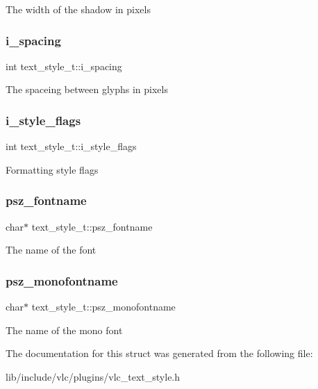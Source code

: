 The width of the shadow in pixels \mbox{\label{structtext__style__t_a2280d36ffa825efb34586276be989ca0}} 
\subsubsection{\texorpdfstring{i\+\_\+spacing}{i\_spacing}}
{\footnotesize\ttfamily int text\+\_\+style\+\_\+t\+::i\+\_\+spacing}

The spaceing between glyphs in pixels \mbox{\label{structtext__style__t_a5eed3da14743434cdd9f3ad856b0057a}} 
\subsubsection{\texorpdfstring{i\+\_\+style\+\_\+flags}{i\_style\_flags}}
{\footnotesize\ttfamily int text\+\_\+style\+\_\+t\+::i\+\_\+style\+\_\+flags}

Formatting style flags \mbox{\label{structtext__style__t_a638ddc05711093db5ce4b05870c19b1e}} 
\subsubsection{\texorpdfstring{psz\+\_\+fontname}{psz\_fontname}}
{\footnotesize\ttfamily char$\ast$ text\+\_\+style\+\_\+t\+::psz\+\_\+fontname}

The name of the font \mbox{\label{structtext__style__t_a9c58ccd12a4cb539c8547f3f8d2ac007}} 
\subsubsection{\texorpdfstring{psz\+\_\+monofontname}{psz\_monofontname}}
{\footnotesize\ttfamily char$\ast$ text\+\_\+style\+\_\+t\+::psz\+\_\+monofontname}

The name of the mono font 

The documentation for this struct was generated from the following file\+:\begin{DoxyCompactItemize}
\item 
lib/include/vlc/plugins/vlc\+\_\+text\+\_\+style.\+h\end{DoxyCompactItemize}
